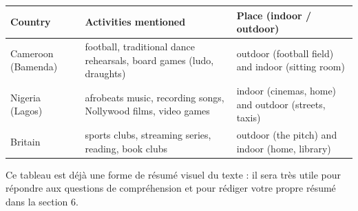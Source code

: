 \documentclass[11pt]{article}
\newcommand{\cle}[1]{{\popxbold\color{popdark}#1}}
\begin{document}
\begin{center}
\begin{tabularx}{\linewidth}{|l|X|X|}
\hline
\rowcolor{popblueL} \textbf{Country} & \textbf{Activities mentioned} & \textbf{Place (indoor / outdoor)} \\
\hline
Cameroon (Bamenda) & football, traditional dance rehearsals, board games (ludo, draughts) & outdoor (football field) and indoor (sitting room) \\
\hline
Nigeria (Lagos) & afrobeats music, recording songs, Nollywood films, video games & indoor (cinemas, home) and outdoor (streets, taxis) \\
\hline
Britain & sports clubs, streaming series, reading, book clubs & outdoor (the pitch) and indoor (home, library) \\
\hline
\end{tabularx}
\end{center}

Ce tableau est déjà une forme de \cle{résumé visuel} du texte : il sera très utile pour répondre aux questions de compréhension et pour rédiger votre propre résumé dans la section 6.
\end{document}

